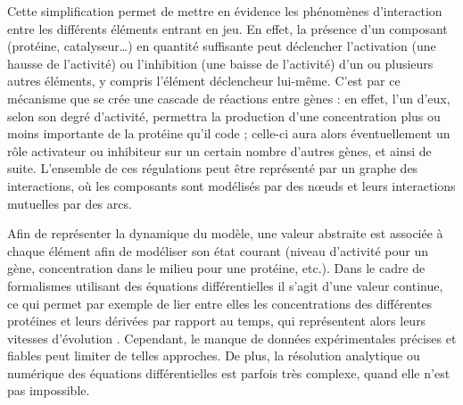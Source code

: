 Cette simplification permet de mettre en évidence les phénomènes d'interaction entre
les différents éléments entrant en jeu.
En effet, la présence d'un composant (protéine, catalyseur…)
en quantité suffisante peut déclencher
l'activation (une hausse de l'activité) ou l'inhibition (une baisse de l'activité)
d'un ou plusieurs autres éléments, y compris l'élément déclencheur lui-même.
C'est par ce mécanisme que se crée une cascade de réactions entre gènes :
en effet, l'un d'eux, selon son degré d'activité,
permettra la production d'une concentration plus ou moins importante de la protéine qu'il code ;
celle-ci aura alors éventuellement un rôle activateur ou inhibiteur sur un certain
nombre d'autres gènes, et ainsi de suite.
L'ensemble de ces régulations peut être représenté par un graphe des interactions,
où les composants sont modélisés par des nœuds et leurs interactions mutuelles par des arcs.


Afin de représenter la dynamique du modèle,
une valeur abstraite est associée à chaque élément afin de modéliser
son état courant
(niveau d'activité pour un gène,
concentration dans le milieu pour une protéine, etc.).
Dans le cadre de formalismes utilisant des équations différentielles
il s'agit d'une valeur continue,
ce qui permet par exemple de lier entre elles
les concentrations des différentes protéines et leurs dérivées par rapport au temps,
qui représentent alors leurs vitesses d'évolution \cite{tyson1978dynamics}.
Cependant, le manque de données expérimentales précises et fiables peut limiter de telles
approches.
De plus, la résolution analytique ou numérique des équations différentielles est parfois
très complexe, quand elle n'est pas impossible.


